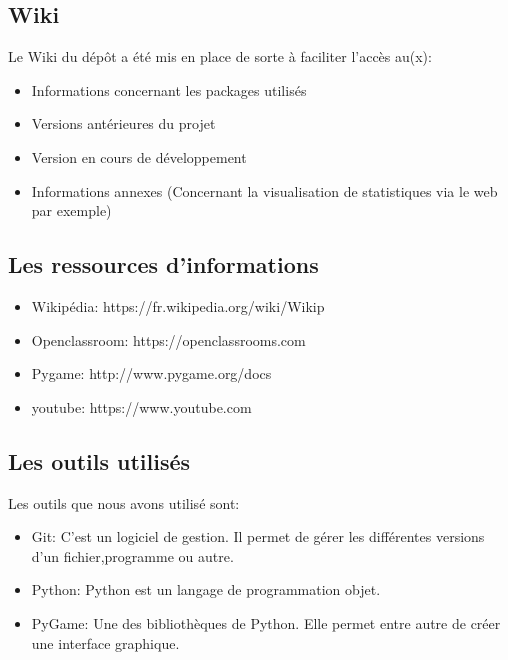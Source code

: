 \documentclass{article}
\begin{document}
 \subsection{Wiki}
 	Le Wiki du dépôt a été mis en place de sorte à faciliter l'accès au(x):
 	\begin{itemize}
 	\item Informations concernant les packages utilisés
 	\item Versions antérieures du projet
 	\item Version en cours de développement
 	\item Informations annexes (Concernant la visualisation de statistiques via le web par exemple)
 	\end{itemize}
 
 \subsection{Les ressources d'informations}
 
 \begin{itemize}
 \item Wikipédia: https://fr.wikipedia.org/wiki/Wikip
 \item Openclassroom: https://openclassrooms.com
 \item Pygame: http://www.pygame.org/docs
 \item youtube: https://www.youtube.com
 \end{itemize} 
 
 \subsection{Les outils utilisés}
  Les outils que nous avons utilisé sont:
  \begin{itemize}
   \item Git: C'est un logiciel de gestion. Il permet de gérer les différentes versions d'un fichier,programme ou autre.
   \item Python: Python est un langage de programmation objet.
   \item PyGame: Une des bibliothèques de Python. Elle permet entre autre de créer une interface graphique.
  \end{itemize}
\end{document}
